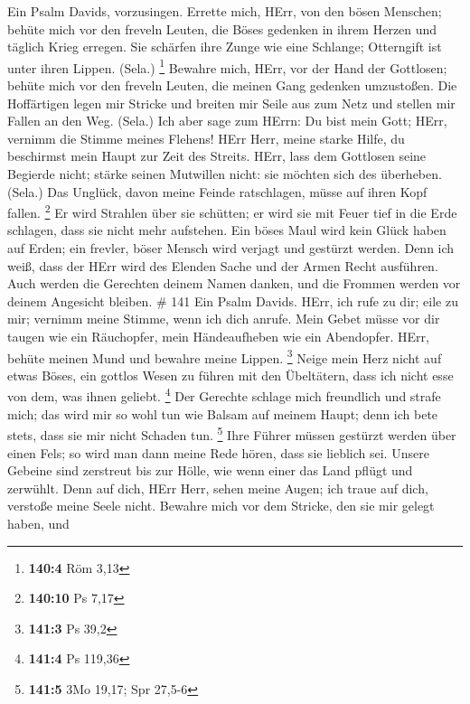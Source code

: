  Ein Psalm Davids, vorzusingen.  Errette mich,
HErr, von den bösen Menschen; behüte mich vor den freveln Leuten,
 die Böses gedenken in ihrem Herzen und täglich Krieg
erregen.  Sie schärfen ihre Zunge wie eine Schlange;
Otterngift ist unter ihren Lippen. (Sela.) \footnote{\textbf{140:4} Röm
  3,13}  Bewahre mich, HErr, vor der Hand der Gottlosen;
behüte mich vor den freveln Leuten, die meinen Gang gedenken umzustoßen.
 Die Hoffärtigen legen mir Stricke und breiten mir Seile aus
zum Netz und stellen mir Fallen an den Weg. (Sela.)  Ich
aber sage zum HErrn: Du bist mein Gott; HErr, vernimm die Stimme meines
Flehens!  HErr Herr, meine starke Hilfe, du beschirmst mein
Haupt zur Zeit des Streits.  HErr, lass dem Gottlosen seine
Begierde nicht; stärke seinen Mutwillen nicht: sie möchten sich des
überheben. (Sela.)  Das Unglück, davon meine Feinde
ratschlagen, müsse auf ihren Kopf fallen. \footnote{\textbf{140:10} Ps
  7,17}  Er wird Strahlen über sie schütten; er wird sie
mit Feuer tief in die Erde schlagen, dass sie nicht mehr aufstehen.
 Ein böses Maul wird kein Glück haben auf Erden; ein
frevler, böser Mensch wird verjagt und gestürzt werden. 
Denn ich weiß, dass der HErr wird des Elenden Sache und der Armen Recht
ausführen.  Auch werden die Gerechten deinem Namen danken,
und die Frommen werden vor deinem Angesicht bleiben. \# 141 
Ein Psalm Davids. HErr, ich rufe zu dir; eile zu mir; vernimm meine
Stimme, wenn ich dich anrufe.  Mein Gebet müsse vor dir
taugen wie ein Räuchopfer, mein Händeaufheben wie ein Abendopfer.
 HErr, behüte meinen Mund und bewahre meine Lippen.
\footnote{\textbf{141:3} Ps 39,2}  Neige mein Herz nicht auf
etwas Böses, ein gottlos Wesen zu führen mit den Übeltätern, dass ich
nicht esse von dem, was ihnen geliebt. \footnote{\textbf{141:4} Ps
  119,36}  Der Gerechte schlage mich freundlich und strafe
mich; das wird mir so wohl tun wie Balsam auf meinem Haupt; denn ich
bete stets, dass sie mir nicht Schaden tun. \footnote{\textbf{141:5} 3Mo
  19,17; Spr 27,5-6}  Ihre Führer müssen gestürzt werden
über einen Fels; so wird man dann meine Rede hören, dass sie lieblich
sei.  Unsere Gebeine sind zerstreut bis zur Hölle, wie wenn
einer das Land pflügt und zerwühlt.  Denn auf dich, HErr
Herr, sehen meine Augen; ich traue auf dich, verstoße meine Seele nicht.
 Bewahre mich vor dem Stricke, den sie mir gelegt haben, und
